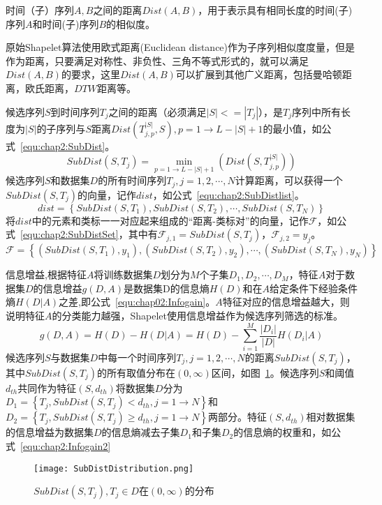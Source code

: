 \begin{definition}
	\label{def:chap2:Dist}
	时间（子）序列$A,B$之间的距离$Dist(A,B)$，用于表示具有相同长度的时间(子)序列$A$和时间(子)序列$B$的相似度。
	
	原始Shapelet算法使用欧式距离(Euclidean distance)作为子序列相似度度量，但是作为距离，只要满足对称性、非负性、三角不等式形式的，就可以满足$Dist(A,B)$的要求，这里$Dist(A,B)$可以扩展到其他广义距离，包括曼哈顿距离，欧氏距离，$DTW$距离等。
\end{definition}
\begin{definition}
\label{def:chap2:SubDist}
	候选序列$S$到时间序列$T_j$之间的距离（必须满足$|S|<=|T_j|$），是$T_j$序列中所有长度为$|S|$的子序列与$S$距离$Dist(T_{j,p}^{|S|},S),p=1\to L-|S|+1$的最小值，如公式~\ref{equ:chap2:SubDist}。
	\begin{equation}\label{equ:chap2:SubDist}
		SubDist(S,T_j) = \min\limits_{p=1\to L-|S|+1} (Dist(S,T_{j,p}^{|S|}))
	\end{equation}
	候选序列$S$和数据集$D$的所有时间序列$T_j,j=1,2,\cdots,N$计算距离，可以获得一个$SubDist(S,T_j)$的向量，记作$dist$，如公式~\ref{equ:chap2:SubDistlist}。
	\begin{equation}
	\label{equ:chap2:SubDistlist}
	dist=\left\lbrace SubDist(S,T_1),SubDist(S,T_2),\cdots,SubDist(S,T_N)\right\rbrace
	\end{equation}
	将$dist$中的元素和类标一一对应起来组成的“距离-类标对”的向量，记作$\mathcal{F}$，如公式~\ref{equ:chap2:SubDistSet}，其中有$\mathcal{F}_{j,1}=SubDist(S,T_j)$，$\mathcal{F}_{j,2}=y_j$。
	\begin{equation}
	\label{equ:chap2:SubDistSet}
	\mathcal{F} = \left\lbrace (SubDist(S,T_1),y_1),(SubDist(S,T_2),y_2),\cdots,(SubDist(S,T_N),y_N) \right\rbrace 
	\end{equation}
\end{definition}
\begin{definition}
	\label{def:chap02:infogain}
	信息增益,根据特征$A$将训练数据集$D$划分为$M$个子集$D_1,D_2,\cdots,D_M$，特征$A$对于数据集$D$的信息增益$g(D,A)$是数据集D的信息熵$H(D)$和在$A$给定条件下经验条件熵$H(D|A)$之差,即公式~\ref{equ:chap02:Infogain}。$A$特征对应的信息增益越大，则说明特征$A$的分类能力越强，Shapelet使用信息增益作为候选序列筛选的标准。
	\begin{equation}
	\label{equ:chap02:Infogain}
	g(D,A) = H(D) - H(D|A) = H(D) - \sum_{i=1}^{M}\frac{|D_i|}{|D|}H(D_i|A)
	\end{equation}
	候选序列$S$与数据集$D$中每一个时间序列$T_j,j=1,2,\cdots,N$的距离$SubDist(S,T_j)$，其中$SubDist(S,T_j)$的所有取值分布在$(0,\infty)$区间，如图~\ref{fig:SubDist}。候选序列$S$和阈值$d_{th}$共同作为特征$(S,d_{th})$将数据集$D$分为$D_1 = \left\lbrace T_j,SubDist(S,T_j)<d_{th},j=1\to N\right\rbrace $和$D_2 = \left\lbrace T_j,SubDist(S,T_j) \geq d_{th},j=1\to  N\right\rbrace$两部分。特征$(S,d_{th})$相对数据集的信息增益为数据集$D$的信息熵减去子集$D_1$和子集$D_2$的信息熵的权重和，如公式~\ref{equ:chap2:Infogain2}
	\begin{figure}[H] %
		\centering
		\texttt{[image: SubDistDistribution.png]}
		\caption{$SubDist(S,T_j),T_j\in D$在$(0,\infty)$的分布}
		\label{fig:SubDist}
	\end{figure}
\end{definition}
